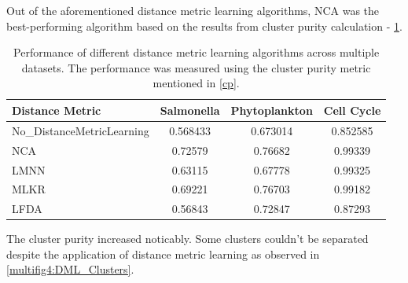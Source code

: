 \documentclass[12pt,a4paper]{article}
\begin{document}
Out of the aforementioned distance metric learning algorithms, NCA was the best-performing algorithm based on the results from cluster purity calculation - \ref{tab:performanceofDML}.


\begin{table}[h]
\small
\centering
\caption{Performance of different distance metric learning algorithms across multiple datasets. The performance was measured using the cluster purity metric mentioned in \ref{cp}.}
\label{tab:performanceofDML}
\begin{tabular}{lccc}
\hline
\textbf{Distance Metric} & \textbf{Salmonella} & \textbf{Phytoplankton} & \textbf{Cell Cycle} \\
\hline
No\_DistanceMetricLearning & 0.568433 & 0.673014 & 0.852585 \\
NCA & 0.72579 & 0.76682 & 0.99339 \\
LMNN & 0.63115 & 0.67778 & 0.99325 \\
MLKR & 0.69221 & 0.76703 & 0.99182 \\
LFDA & 0.56843 & 0.72847 & 0.87293 \\
\hline
\end{tabular}
\end{table}



The cluster purity increased noticably. Some clusters couldn't be separated despite the application of distance metric learning as observed in \ref{multifig4:DML_Clusters}.
\end{document}
